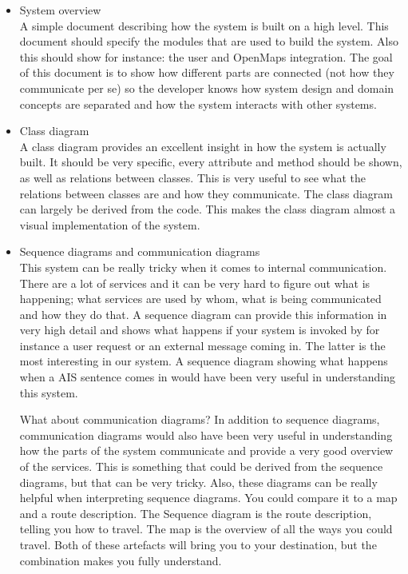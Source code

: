 \documentclass[12pt]{article}
\begin{document}
\begin{itemize}
\item System overview\\
A simple document describing how the system is built on a high level. This document should specify the modules that are used to build the system. Also this should show for instance: the user and OpenMaps integration. The goal of this document is to show how different parts are connected (not how they communicate per se) so the developer knows how system design and domain concepts are separated and how the system interacts with other systems.

\item Class diagram\\
A class diagram provides an excellent insight in how the system is actually built. It should be very specific, every attribute and method should be shown, as well as relations between classes. This is very useful to see what the relations between classes are and how they communicate. The class diagram can largely be derived from the code. This makes the class diagram almost a visual implementation of the system.

\item Sequence diagrams and communication diagrams \\
This system can be really tricky when it comes to internal communication. There are a lot of services and it can be very hard to figure out what is happening; what services are used by whom, what is being communicated and how they do that. A sequence diagram can provide this information in very high detail and shows what happens if your system is invoked by for instance a user request or an external message coming in. The latter is the most interesting in our system. A sequence diagram showing what happens when a AIS sentence comes in would have been very useful in understanding this system.

What about communication diagrams? In addition to sequence diagrams, communication diagrams would also have been very useful in understanding how the parts of the system communicate and provide a very good overview of the services. This is something that could be derived from the sequence diagrams, but that can be very tricky. Also, these diagrams can be really helpful when interpreting sequence diagrams. You could compare it to a map and a route description. The Sequence diagram is the route description, telling you how to travel. The map is the overview of all the ways you could travel. Both of these artefacts will bring you to your destination, but the combination makes you fully understand.

\end{itemize}
\end{document}
